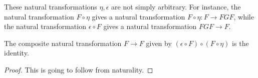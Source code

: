These natural transformations $\eta, \epsilon$ are not simply arbitrary. For
instance, the natural transformation $F \circ \eta$ gives a natural
transformation $F \circ \eta: F \to FGF$, while the natural transformation
$\epsilon \circ F$ gives a natural transformation $FGF \to F$.

\begin{lemma}  The composite natural transformation $F \to F$ given by
$(\epsilon \circ F) \circ (F \circ \eta)$ is the identity. 
\end{lemma} 
\begin{proof}
This is going to follow from naturality. 
\begin{comment}
First, given an object $c$, $(F \circ \eta)(c)$ is  the map $Fc \to FGF c$
obtained by applying $F$ to the morphism $c \to GF c$. 

Given an object $c$, $(\epsilon \circ F)(c)$ is the morphism $FGF c \to Fc$
corresponding to the morphism $GF c \to GF c$ under the adjoint property.
\end{comment}
\end{proof} 

